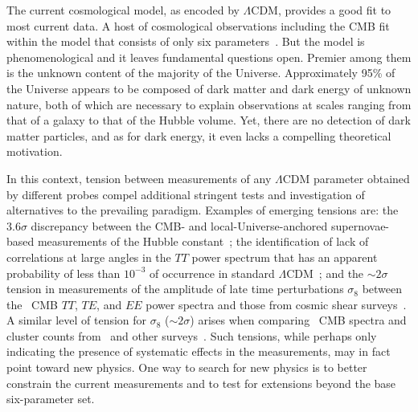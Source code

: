 \documentclass[PICOReport.tex]{subfiles}
\begin{document}

The current cosmological model, as encoded by $\Lambda$CDM, provides a good fit to most current data. A host of cosmological observations including the CMB fit within the model that consists of only six parameters~\citep{Planck2018_I}. But the model is phenomenological and it leaves fundamental questions open. Premier among them is the unknown content of the majority of the Universe. Approximately 95\% of the Universe appears to be composed of dark matter and dark energy of unknown nature, both of which are necessary to explain observations at scales ranging from that of a galaxy to that of the Hubble volume. Yet, there are no detection of dark matter particles, and as for dark energy, it even lacks a compelling theoretical motivation.

In this context, tension between measurements of any $\Lambda$CDM parameter obtained by different probes compel additional stringent tests and investigation of alternatives to the prevailing paradigm. Examples of emerging tensions are: the $3.6\sigma$ discrepancy between the CMB- and local-Universe-anchored supernovae-based measurements of the Hubble constant~\citep{Aghanim:2018eyx,Riess2018}; the identification of lack of correlations at large angles in the $TT$ power spectrum that has an apparent probability of less than $10^{-3}$ of occurrence in standard $\Lambda$CDM~\citep{TT_correlations}; and the $\sim 2\sigma$ tension in measurements of the amplitude of late time perturbations $\sigma_{8}$ between 
the \planck\ CMB $TT$, $TE$, and $EE$ power spectra and those from cosmic shear surveys~\citep{Joudaki+2017, Abbott+2018, Hikage+2018, vanUitert+2018}.  A similar level  of tension for $\sigma_{8}$ ($\sim2\sigma$) arises when comparing \planck\ CMB spectra and cluster counts from \planck\ and other surveys~\citep{Planck, Bocquet+2018}. Such tensions, while perhaps only indicating the presence of systematic effects in the measurements, may in fact point toward new physics. One way to search for new physics is to better constrain the current measurements and to test for extensions beyond the base six-parameter set. 
\end{document}
